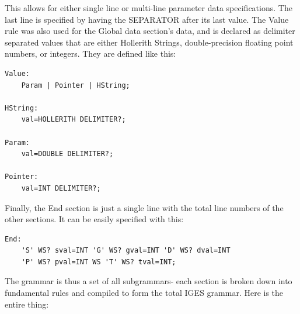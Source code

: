 This allows for either single line or multi-line parameter data specifications. The last line is specified by having the SEPARATOR after its last value. The Value rule was also used for the Global data section's data, and is declared as delimiter separated values that are either Hollerith Strings, double-precision floating point numbers, or integers. They are defined like this:
\begin{Verbatim}
Value:
    Param | Pointer | HString;

HString:
    val=HOLLERITH DELIMITER?;

Param:
    val=DOUBLE DELIMITER?;

Pointer:
    val=INT DELIMITER?;
\end{Verbatim}

Finally, the End section is just a single line with the total line numbers of the other sections. It can be easily specified with this:
\begin{Verbatim}
End:
    'S' WS? sval=INT 'G' WS? gval=INT 'D' WS? dval=INT
    'P' WS? pval=INT WS 'T' WS? tval=INT;
\end{Verbatim}

The grammar is thus a set of all subgrammars- each section is broken down into fundamental rules and compiled to form the total IGES grammar. Here is the entire thing:

